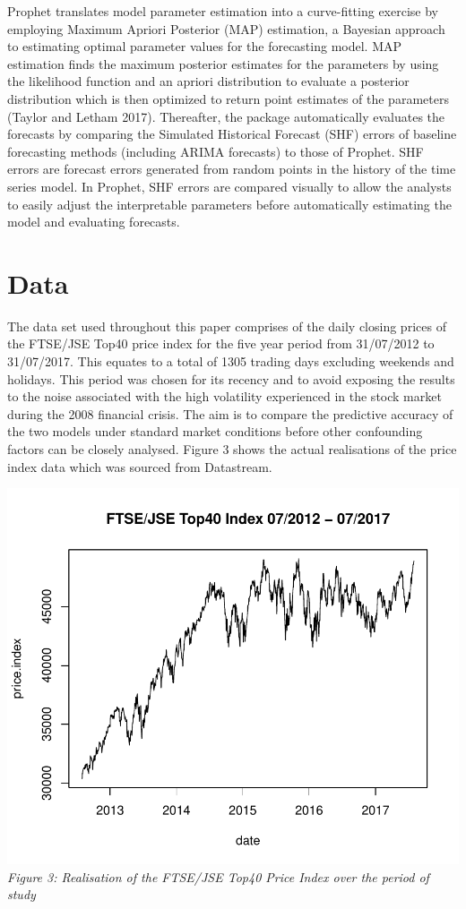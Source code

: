 \documentclass[12pt,a4paper]{article}
\numberwithin{equation}{section}
\numberwithin{figure}{section}
\numberwithin{table}{section}
\begin{document}
Prophet translates model parameter estimation into a curve-fitting
exercise by employing Maximum Apriori Posterior (MAP) estimation, a
Bayesian approach to estimating optimal parameter values for the
forecasting model. MAP estimation finds the maximum posterior estimates
for the parameters by using the likelihood function and an apriori
distribution to evaluate a posterior distribution which is then
optimized to return point estimates of the parameters (Taylor and Letham
2017). Thereafter, the package automatically evaluates the forecasts by
comparing the Simulated Historical Forecast (SHF) errors of baseline
forecasting methods (including ARIMA forecasts) to those of Prophet. SHF
errors are forecast errors generated from random points in the history
of the time series model. In Prophet, SHF errors are compared visually
to allow the analysts to easily adjust the interpretable parameters
before automatically estimating the model and evaluating forecasts.

\section{Data}\label{data}

The data set used throughout this paper comprises of the daily closing
prices of the FTSE/JSE Top40 price index for the five year period from
31/07/2012 to 31/07/2017. This equates to a total of 1305 trading days
excluding weekends and holidays. This period was chosen for its recency
and to avoid exposing the results to the noise associated with the high
volatility experienced in the stock market during the 2008 financial
crisis. The aim is to compare the predictive accuracy of the two models
under standard market conditions before other confounding factors can be
closely analysed. Figure 3 shows the actual realisations of the price
index data which was sourced from Datastream.

\includegraphics{Draft_Paper_files/figure-latex/unnamed-chunk-1-1.pdf}
\emph{Figure 3: Realisation of the FTSE/JSE Top40 Price Index over the
period of study}
\end{document}
